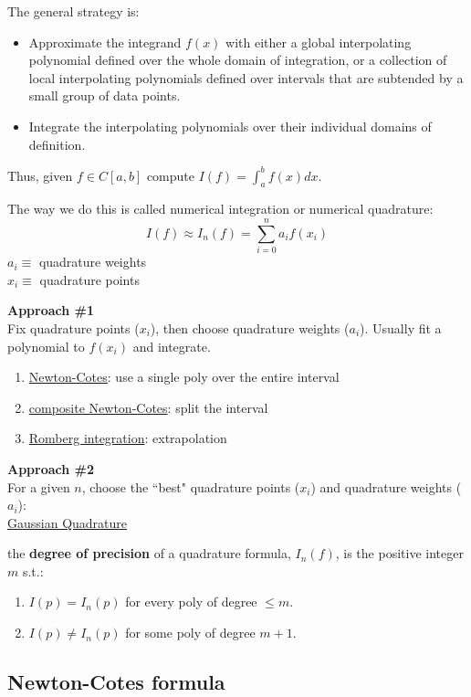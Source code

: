 \documentclass[12pt]{article}
\begin{document}
The general strategy is:
\begin{itemize}
\item Approximate the integrand $f(x)$ with either a global interpolating
polynomial defined over the whole domain of integration, or a
collection of local interpolating polynomials defined over intervals
that are subtended by a small group of data points.
\item Integrate the interpolating polynomials over their individual
domains of definition.
\end{itemize}

Thus, given $f \in C[a,b]$ compute $I(f) = \int_a^b f(x) dx$.

The way we do this is called numerical integration or numerical quadrature:
\[I(f) \approx I_n(f) = \sum_{i=0}^n a_i f(x_i)\]
$a_i \equiv$ quadrature weights\\
$x_i \equiv$ quadrature points

\textbf{Approach \#1}\\
Fix quadrature points ($x_i$), then choose quadrature weights ($a_i$). Usually fit a polynomial to $f(x_i)$ and integrate.
%
\begin{enumerate}%
\item \underline{Newton-Cotes}: use a single poly over the entire interval
\item \underline{composite Newton-Cotes}: split the interval
\item \underline{Romberg integration}: extrapolation
\end{enumerate}

\textbf{Approach \#2}\\
For a given $n$, choose the ``best" quadrature points ($x_i$) and quadrature weights ($a_i$):\\
\underline{Gaussian Quadrature}

the \textbf{degree of precision} of a quadrature formula, $I_n(f)$, is the positive integer $m$ s.t.:
\begin{enumerate}
\item $I(p) = I_n(p)$ for every poly of degree $\leq m$.
\item $I(p) \neq I_n(p)$ for some poly of degree $m+1$.
\end{enumerate}
 
 
\subsection{Newton-Cotes formula}
 
\end{document}
